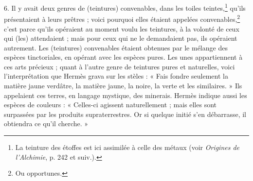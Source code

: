 \documentclass[landscape, a4paper, 11pt, oneside, polutonikogreek, french]{article}
\begin{document}
6. Il y avait deux genres de (teintures) convenables, dans les toiles teintes,\footnote{La teinture des étoffes est ici assimilée à celle des métaux (voir \emph{Origines de l'Alchimie}, p. 242 et suiv.).} qu'ils présentaient à leurs prêtres ; voici pourquoi elles étaient appelées convenables,\footnote{Ou opportunes.} c'est parce qu'ils opéraient au moment voulu les teintures, à la volonté de ceux qui (les) attendaient ; mais pour ceux qui ne le demandaient pas, ils opéraient autrement. Les (teintures) convenables étaient obtenues par le mélange des espèces tinctoriales, en opérant avec les espèces pures. Les unes appartiennent à ces arts précieux ; quant à l'autre genre de teintures pures et naturelles, voici l'interprétation que Hermès grava sur les stèles : « Fais fondre seulement la matière jaune verdâtre, la matière jaune, la noire, la verte et les similaires. » Ils appelaient ces terres, en langage mystique, des minerais. Hermès indique aussi les espèces de couleurs : « Celles-ci agissent naturellement ; mais elles sont surpassées par les produits supraterrestres. Or si quelque initié s'en débarrasse, il obtiendra ce qu'il cherche. »
\end{document}
